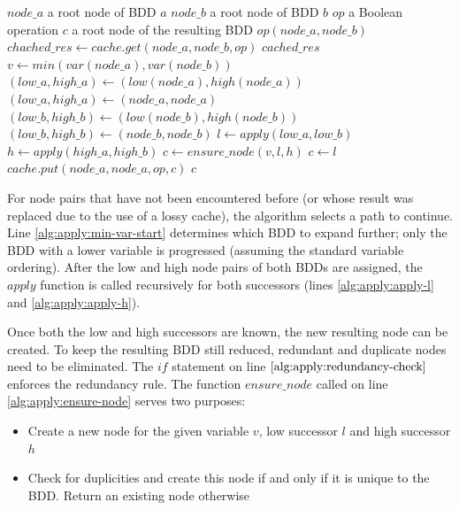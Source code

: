 \begin{algorithm}
    \caption{Apply}\label{alg:apply}
    \begin{algorithmic}[1]
        \Require $node\_a$ a root node of BDD $a$
        \Require $node\_b$ a root node of BDD $b$
        \Require $op$ a Boolean operation
        \Ensure $c$ a root node of the resulting BDD
             \label{alg:apply:recursion-stop}
                \State \Return  $op(node\_a, node\_b)$
            \EndIf
            \State $chached\_res \gets cache.get(node\_a, node\_b, op)$
             \label{alg:apply:cache-get}
                \State \Return $cached\_res$
            \EndIf
            \State $v \gets min(var(node\_a), var(node\_b))$ \label{alg:apply:min-var-start}
                \State $(low\_a, high\_a) \gets (low(node\_a), high(node\_a))$
            \Else
                \State $(low\_a, high\_a) \gets (node\_a, node\_a)$
            \EndIf
                \State $(low\_b, high\_b) \gets (low(node\_b), high(node\_b))$
            \Else
                \State $(low\_b, high\_b) \gets (node\_b, node\_b)$
            \EndIf \label{alg:apply:min-var-end}
            \State $l \gets apply(low\_a, low\_b)$ \label{alg:apply:apply-l}
            \State $h \gets apply(high\_a, high\_b)$ \label{alg:apply:apply-h}
             \label{alg:apply:redundancy-check}
                \State $c \gets ensure\_node(v, l, h)$ \label{alg:apply:ensure-node}
            \Else
                \State $c \gets l$
            \EndIf
            \State $cache.put(node\_a, node\_a, op, c)$
            \State \Return $c$
        \EndFunction
    \end{algorithmic}
\end{algorithm}

For node pairs that have not been encountered before (or whose result was replaced due to the use of a lossy cache),
the algorithm selects a path to continue. Line \ref{alg:apply:min-var-start} determines which BDD to expand further;
only the BDD with a lower variable is progressed (assuming the standard variable ordering). After the low and high
node pairs of both BDDs are assigned, the $apply$ function is called recursively for both successors (lines
\ref{alg:apply:apply-l} and \ref{alg:apply:apply-h}).

Once both the low and high successors are known, the new resulting node can be created. To keep the resulting BDD
still reduced, redundant and duplicate nodes need to be eliminated. The $if$ statement on line
$\ref{alg:apply:redundancy-check}$ enforces the redundancy rule. The function $ensure\_node$ called on line
\ref{alg:apply:ensure-node} serves two purposes:
\begin{itemize}
    \item Create a new node for the given variable $v$, low successor $l$ and high successor $h$
    \item Check for duplicities and create this node if and only if it is unique to the BDD. Return an existing node
        otherwise
\end{itemize}

